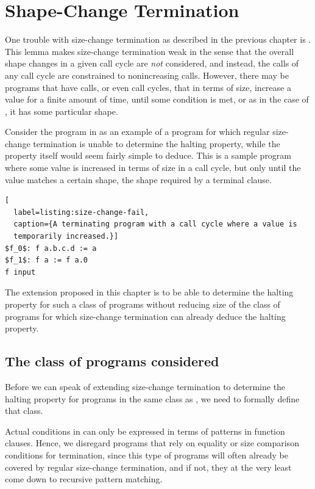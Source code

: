 \chapter{Shape-Change Termination}

One trouble with size-change termination as described in the previous chapter
is . This lemma makes size-change termination weak
in the sense that the overall shape changes in a given call cycle are
\emph{not} considered, and instead, the calls of any call cycle are constrained
to nonincreasing calls. However, there may be programs that have calls, or even
call cycles, that in terms of size, increase a value for a finite amount of
time, until some condition is met, or as in the case of \D{}, it has some
particular shape.


Consider the program in  as an example of a
program for which regular size-change termination is unable to determine the
halting property, while the property itself would seem fairly simple to deduce.
This is a sample program where some value is increased in terms of size in a
call cycle, but only until the value matches a certain shape, the shape
required by a terminal clause.

\begin{lstlisting}[
  label=listing:size-change-fail,
  caption={A terminating program with a call cycle where a value is
  temporarily increased.}]
$f_0$: f a.b.c.d := a
$f_1$: f a := f a.0
f input
\end{lstlisting}

The extension proposed in this chapter is to be able to determine the halting
property for such a class of programs without reducing size of the class of
programs for which size-change termination can already deduce the halting
property.

\section{The class of programs considered}

Before we can speak of extending size-change termination to determine the
halting property for programs in the same class as
, we need to formally define that class.

Actual conditions in \D{} can only be expressed in terms of patterns in
function clauses. Hence, we disregard programs that rely on equality or size
comparison conditions for termination, since this type of programs will often
already be covered by regular size-change termination, and if not, they at the
very least come down to recursive pattern matching.

